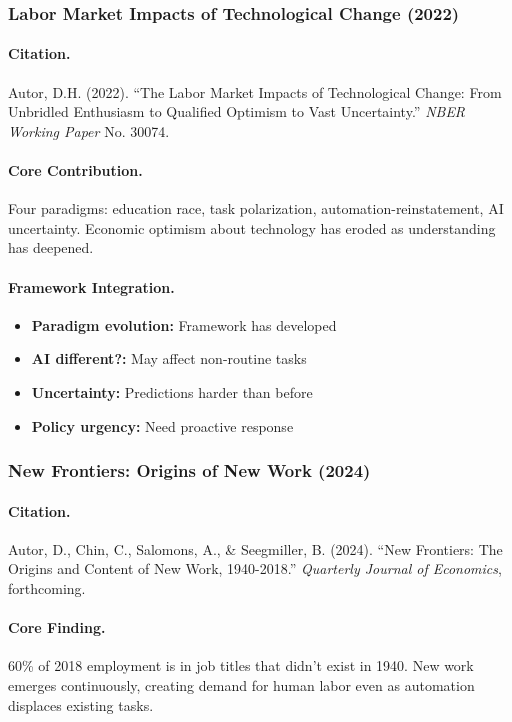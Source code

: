 \subsubsection{Labor Market Impacts of Technological Change (2022)}

\paragraph{Citation.}
Autor, D.H. (2022). ``The Labor Market Impacts of Technological Change:
From Unbridled Enthusiasm to Qualified Optimism to Vast Uncertainty.''
\emph{NBER Working Paper} No. 30074.

\paragraph{Core Contribution.}
Four paradigms: education race, task polarization, automation-reinstatement,
AI uncertainty. Economic optimism about technology has eroded as
understanding has deepened.

\paragraph{Framework Integration.}
\begin{itemize}
  \item \textbf{Paradigm evolution:} Framework has developed
  \item \textbf{AI different?:} May affect non-routine tasks
  \item \textbf{Uncertainty:} Predictions harder than before
  \item \textbf{Policy urgency:} Need proactive response
\end{itemize}

\subsubsection{New Frontiers: Origins of New Work (2024)}

\paragraph{Citation.}
Autor, D., Chin, C., Salomons, A., \& Seegmiller, B. (2024).
``New Frontiers: The Origins and Content of New Work, 1940-2018.''
\emph{Quarterly Journal of Economics}, forthcoming.

\paragraph{Core Finding.}
60\% of 2018 employment is in job titles that didn't exist in 1940.
New work emerges continuously, creating demand for human labor
even as automation displaces existing tasks.

